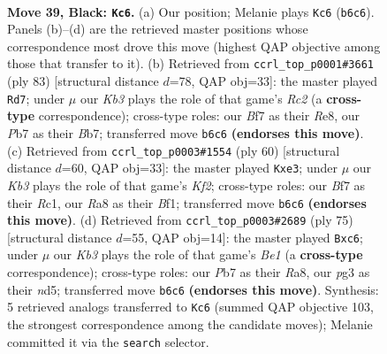 \documentclass[11pt]{article}
\begin{document}
\clearpage

\begin{figure}[p]\centering
\begin{subfigure}{0.46\textwidth}\centering
\resizebox{\linewidth}{!}{%
\newchessgame
\chessboard[
  setfen={rn1b2r1/1p3b1p/1k4pP/pN2Pp2/P2p4/1N1R2P1/1B5K/R7 b - - 3 39},
  showmover=false,
  pgfstyle=straightmove, color=movearrow, markmove={b6-c6}
]}
\caption{}
\end{subfigure}\hfill
\begin{subfigure}{0.46\textwidth}\centering
\resizebox{\linewidth}{!}{%
\newchessgame
\chessboard[
  setfen={4rb2/1br2pk1/p5p1/3p3p/R2P3P/2N1PBP1/1P2R3/6K1 b - - 5 42},
  showmover=false,
  pgfstyle=straightmove, color=movearrow, markmove={c7-d7}
]}
\caption{}
\end{subfigure}
\\[4pt]
\begin{subfigure}{0.46\textwidth}\centering
\resizebox{\linewidth}{!}{%
\newchessgame
\chessboard[
  setfen={2r3k1/1b4pp/4pp2/8/r1P5/p3nP2/P2R1KPP/2R2B2 w - - 0 31},
  showmover=false,
  pgfstyle=straightmove, color=movearrow, markmove={f2-e3}
]}
\caption{}
\end{subfigure}\hfill
\begin{subfigure}{0.46\textwidth}\centering
\resizebox{\linewidth}{!}{%
\newchessgame
\chessboard[
  setfen={r3bk2/4pp2/1pNp3b/3Nn2P/pP2B3/7P/P4R2/3R2K1 b - - 0 38},
  showmover=false,
  pgfstyle=straightmove, color=movearrow, markmove={e8-c6}
]}
\caption{}
\end{subfigure}
\caption{\textbf{Move 39, Black: \texttt{Kc6}.} (a) Our position; Melanie plays \texttt{Kc6} (\texttt{b6c6}). Panels (b)--(d) are the retrieved master positions whose correspondence most drove this move (highest QAP objective among those that transfer to it). (b) Retrieved from \texttt{ccrl\_top\_p0001\#3661} (ply 83) [structural distance $d$=78, QAP obj=33]: the master played \texttt{Rd7}; under $\mu$ our \emph{Kb3} plays the role of that game's \emph{Rc2} (a \textbf{cross-type} correspondence); cross-type roles: our \emph{B}f7 as their \emph{R}e8, our \emph{P}b7 as their \emph{B}b7; transferred move \texttt{b6c6} \textbf{(endorses this move)}. (c) Retrieved from \texttt{ccrl\_top\_p0003\#1554} (ply 60) [structural distance $d$=60, QAP obj=33]: the master played \texttt{Kxe3}; under $\mu$ our \emph{Kb3} plays the role of that game's \emph{Kf2}; cross-type roles: our \emph{B}f7 as their \emph{R}c1, our \emph{R}a8 as their \emph{B}f1; transferred move \texttt{b6c6} \textbf{(endorses this move)}. (d) Retrieved from \texttt{ccrl\_top\_p0003\#2689} (ply 75) [structural distance $d$=55, QAP obj=14]: the master played \texttt{Bxc6}; under $\mu$ our \emph{Kb3} plays the role of that game's \emph{Be1} (a \textbf{cross-type} correspondence); cross-type roles: our \emph{P}b7 as their \emph{R}a8, our \emph{p}g3 as their \emph{n}d5; transferred move \texttt{b6c6} \textbf{(endorses this move)}. Synthesis: 5 retrieved analogs transferred to \texttt{Kc6} (summed QAP objective 103, the strongest correspondence among the candidate moves); Melanie committed it via the \texttt{search} selector.}
\label{fig:thought-m77}
\end{figure}
\end{document}
